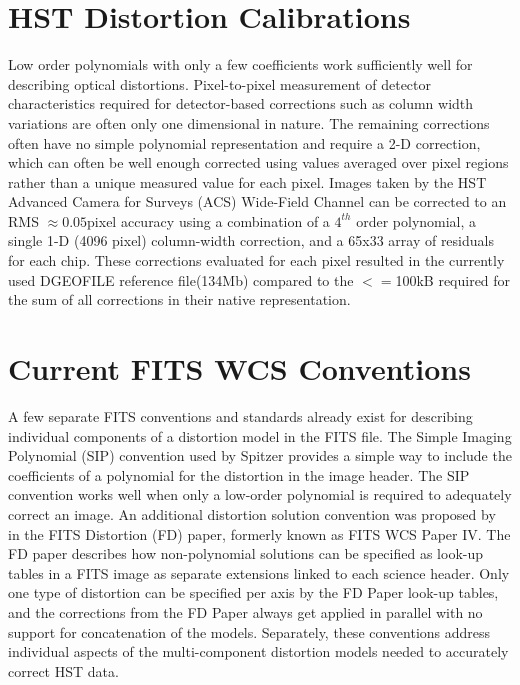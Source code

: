 \section{HST Distortion Calibrations}
Low order polynomials with only a few coefficients work sufficiently well for describing optical distortions. Pixel-to-pixel measurement of detector characteristics required for detector-based corrections such as column width variations are often only one dimensional in nature.  The remaining corrections often have no simple polynomial representation and require a 2-D correction, which can often be well enough corrected using values averaged over pixel regions rather than a unique measured value for each pixel. Images taken by the HST Advanced Camera for Surveys (ACS) Wide-Field Channel can be corrected to an RMS $\approx 0.05$pixel accuracy using a combination of a $4^{th}$ order polynomial, a single 1-D (4096 pixel) column-width correction, and a 65x33 array of residuals for each chip. These corrections evaluated for each pixel resulted in the currently used DGEOFILE reference file(134Mb) compared to the $<=$100kB required for the sum of all corrections in their native representation. 

\section{Current FITS WCS Conventions}
A few separate FITS conventions and standards already exist for describing individual components of a distortion model in the FITS file. The Simple Imaging Polynomial (SIP)\citep{shupe_2005} convention used by Spitzer provides a simple way to include the coefficients of a polynomial for the distortion in the image header. The SIP convention works well when only a low-order polynomial is required to adequately correct an image. An additional distortion solution convention was proposed by \citet{Calabretta2012} in the FITS Distortion (FD) paper, formerly known as FITS WCS Paper IV. The FD paper describes how non-polynomial solutions can be specified as look-up tables in a FITS image as separate extensions linked to each science header.  Only one type of distortion can be specified per axis by the FD Paper look-up tables, and the corrections from the FD Paper always get applied in parallel with no support for concatenation of the models.  Separately, these conventions address individual aspects of the multi-component distortion models needed to accurately correct HST data.

